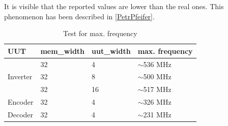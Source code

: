 It is visible that the reported values are lower than the real ones. This phenomenon has been described in \ref{PetrPfeifer}.

\begin{table}[]
\label{tab:max_freq}
\begin{tabular}{@{}llll@{}}
\toprule
UUT                       &mem\_width   &uut\_width &max. frequency \\ 
\midrule
\multirow{3}{*}{Inverter} &32           &4       & $\sim$536 MHz\\ 
                          & 32          & 8      & $\sim$500 MHz \\  
                          & 32          & 16     & $\sim$517 MHz \\ 
\midrule
Encoder                   & 32          & 4      & $\sim$326 MHz \\ 
\midrule
Decoder                   & 32          & 4      & $\sim$231 MHz \\  
\bottomrule
\end{tabular}
\centering
\caption{Test for max. frequency}
\end{table}

